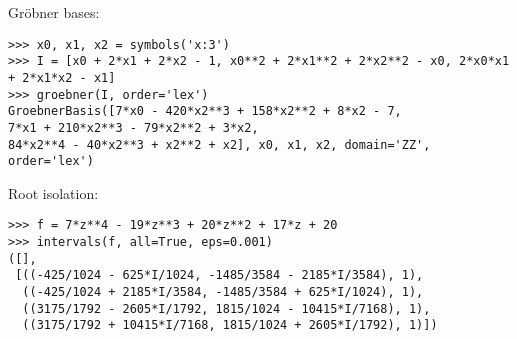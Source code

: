 \noindent Gröbner bases:
\begin{verbatim}
>>> x0, x1, x2 = symbols('x:3')
>>> I = [x0 + 2*x1 + 2*x2 - 1, x0**2 + 2*x1**2 + 2*x2**2 - x0, 2*x0*x1 + 2*x1*x2 - x1]
>>> groebner(I, order='lex')
GroebnerBasis([7*x0 - 420*x2**3 + 158*x2**2 + 8*x2 - 7,
7*x1 + 210*x2**3 - 79*x2**2 + 3*x2,
84*x2**4 - 40*x2**3 + x2**2 + x2], x0, x1, x2, domain='ZZ', order='lex')
\end{verbatim}

\noindent Root isolation:
\begin{verbatim}
>>> f = 7*z**4 - 19*z**3 + 20*z**2 + 17*z + 20
>>> intervals(f, all=True, eps=0.001)
([],
 [((-425/1024 - 625*I/1024, -1485/3584 - 2185*I/3584), 1),
  ((-425/1024 + 2185*I/3584, -1485/3584 + 625*I/1024), 1),
  ((3175/1792 - 2605*I/1792, 1815/1024 - 10415*I/7168), 1),
  ((3175/1792 + 10415*I/7168, 1815/1024 + 2605*I/1792), 1)])
\end{verbatim}
